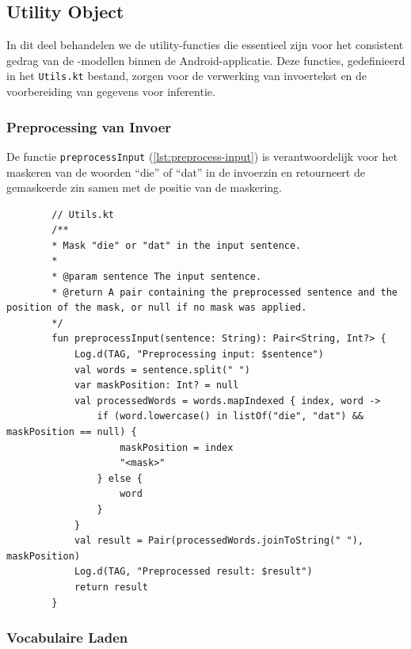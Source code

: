 \subsection{Utility Object}

In dit deel behandelen we de utility-functies die essentieel zijn voor het consistent gedrag van de -modellen binnen de Android-applicatie. Deze functies, gedefinieerd in het \texttt{Utils.kt} bestand, zorgen voor de verwerking van invoertekst en de voorbereiding van gegevens voor inferentie.

\subsubsection{Preprocessing van Invoer}

De functie \texttt{preprocessInput} (\ref{lst:preprocess-input}) is verantwoordelijk voor het maskeren van de woorden ``die'' of ``dat'' in de invoerzin en retourneert de gemaskeerde zin samen met de positie van de maskering.

\begin{listing}
    \begin{verbatim}
        // Utils.kt
        /**
        * Mask "die" or "dat" in the input sentence.
        *
        * @param sentence The input sentence.
        * @return A pair containing the preprocessed sentence and the position of the mask, or null if no mask was applied.
        */
        fun preprocessInput(sentence: String): Pair<String, Int?> {
            Log.d(TAG, "Preprocessing input: $sentence")
            val words = sentence.split(" ")
            var maskPosition: Int? = null
            val processedWords = words.mapIndexed { index, word ->
                if (word.lowercase() in listOf("die", "dat") && maskPosition == null) {
                    maskPosition = index
                    "<mask>"
                } else {
                    word
                }
            }
            val result = Pair(processedWords.joinToString(" "), maskPosition)
            Log.d(TAG, "Preprocessed result: $result")
            return result
        }
    \end{verbatim}
    \caption[\texttt{preprocessInput}]{De \texttt{preprocessInput} functie maskeert de woorden ``die'' of ``dat'' in de invoerzin en geeft de gemaskeerde zin en de positie van het masker terug.}
    \label{lst:preprocess-input}
\end{listing}

\subsubsection{Vocabulaire Laden}

